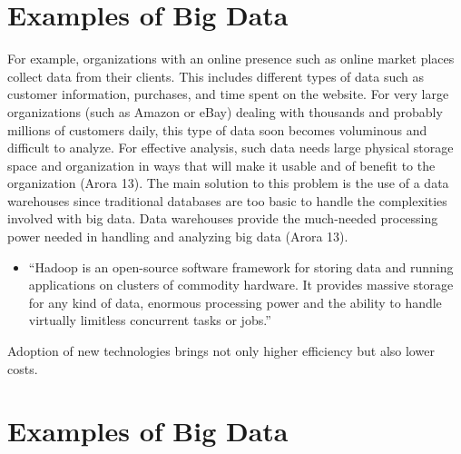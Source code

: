 \documentclass[sigconf]{acmart}
\begin{document}
\section{Examples of Big Data}
For example, organizations with an online presence such as online market places collect data from their clients. This includes different types of data such as customer information, purchases, and time spent on the website. For very large organizations (such as Amazon or eBay) dealing with thousands and probably millions of customers daily, this type of data soon becomes voluminous and difficult to analyze. For effective analysis, such data needs large physical storage space and organization in ways that will make it usable and of benefit to the organization (Arora 13). The main solution to this problem is the use of a data warehouses since traditional databases are too basic to handle the complexities involved with big data. Data warehouses provide the much-needed processing power needed in handling and analyzing big data (Arora 13).
\begin{itemize}

  \item ``Hadoop is an open-source software framework for storing data and running applications on clusters of commodity hardware. It provides massive storage for any kind of data, enormous processing power and the ability to handle virtually limitless concurrent tasks or jobs\cite{sas1}.''
\end{itemize}
Adoption of new technologies brings not only higher efficiency but also lower costs.
\section{Examples of Big Data}
\end{document}
